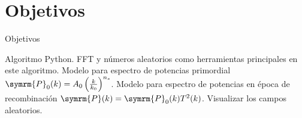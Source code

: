 \section{Objetivos}
\begin{frame}[noframenumbering]{Objetivos}
    \begin{itemize}
        \okitem Algoritmo Python.
        \okitem FFT y números aleatorios como herramientas principales en este algoritmo.
        \okitem Modelo para espectro de potencias primordial \(\symrm{P}_0(k)=A_0\left(\frac{k}{k_0}\right)^{n_s}\).
        \okitem Modelo para espectro de potencias en época de recombinación \(\symrm{P}(k)=\symrm{P}_0(k)T^2(k)\).
        \okitem Visualizar los campos aleatorios.
    \end{itemize}
\end{frame}